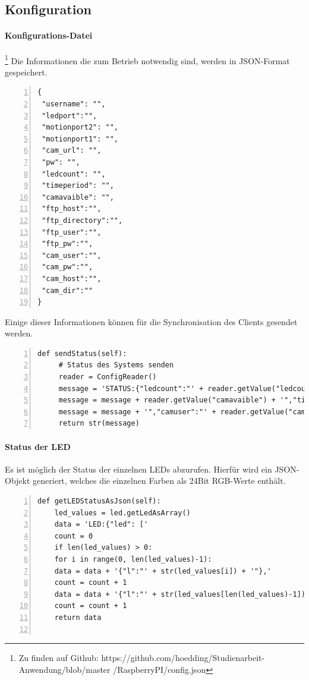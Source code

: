 \subsection{Konfiguration}
\paragraph{Konfigurations-Datei}\footnote{Zu finden auf Github: https://github.com/hoedding/Studienarbeit-Anwendung/blob/master /RaspberryPI/config.json}
Die Informationen die zum Betrieb notwendig sind, werden in JSON-Format gespeichert.
\begin{lstlisting}[caption=Konfigurationsdatei config.json, language=xml, frame=single, breaklines=true,columns=fullflexible, commentstyle=\color{gray}\upshape, captionpos=b, numbers = left]
{
 "username": "",
 "ledport":"", 
 "motionport2": "", 
 "motionport1": "", 
 "cam_url": "", 
 "pw": "", 
 "ledcount": "", 
 "timeperiod": "", 
 "camavaible": "", 
 "ftp_host":"", 
 "ftp_directory":"", 
 "ftp_user":"", 
 "ftp_pw":"", 
 "cam_user":"", 
 "cam_pw":"", 
 "cam_host":"",
 "cam_dir":""
}
\end{lstlisting}
Einige dieser Informationen können für die Synchronisation des Clients gesendet werden.
\begin{lstlisting}[caption=Senden von Konfigurationsinformationen an den Client, language=xml, frame=single, breaklines=true,columns=fullflexible, commentstyle=\color{gray}\upshape, captionpos=b, numbers = left]
def sendStatus(self):
	 # Status des Systems senden
	 reader = ConfigReader()
	 message = 'STATUS:{"ledcount":"' + reader.getValue("ledcount") + '","motionport1":"' + reader.getValue("motionport1") + '","motionport2":"' + reader.getValue("motionport2") + '","camavaible":"'
	 message = message + reader.getValue("camavaible") + '","timeperiod":"' + reader.getValue("timeperiod") + '","ftpdir":"' + reader.getValue("ftp_directory") + '","ftphost":"' + reader.getValue("ftp_host")
	 message = message + '","camuser":"' + reader.getValue("cam_user") + '","ftpuser":"' + reader.getValue("ftp_user") + '","ftppw":"' + reader.getValue("ftp_pw") + '","camhost":"' + reader.getValue("cam_host") + '"}'
	 return str(message)
\end{lstlisting}

\paragraph{Status der LED} Es ist möglich der Status der einzelnen LEDs abzurufen. Hierfür wird ein JSON-Objekt generiert, welches die einzelnen Farben als 24Bit RGB-Werte enthält.
\begin{lstlisting}[caption=Status der LEDs an Client senden, language=xml, frame=single, breaklines=true,columns=fullflexible, commentstyle=\color{gray}\upshape, captionpos=b, numbers = left]
def getLEDStatusAsJson(self):
	led_values = led.getLedAsArray()
	data = 'LED:{"led": ['
	count = 0
	if len(led_values) > 0:
	for i in range(0, len(led_values)-1):
	data = data + '{"l":"' + str(led_values[i]) + '"},'
	count = count + 1
	data = data + '{"l":"' + str(led_values[len(led_values)-1]) + '"}]}'
	count = count + 1
	return data
  
\end{lstlisting}

